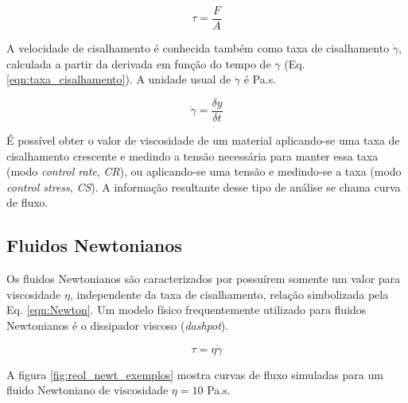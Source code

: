 			\begin{equation}
				\tau = \frac{F}{A}
				\label{eqn:tensao_cisalhamento}
			\end{equation}
			
			A velocidade de cisalhamento é conhecida também como taxa de cisalhamento \(\dot{\gamma}\), calculada a partir da derivada em função do tempo de \(\gamma\) (Eq. \ref{eqn:taxa_cisalhamento}). A unidade usual de \(\dot{\gamma}\) é Pa.s\menosUm.
			
			\begin{equation}
				\dot{\gamma} = \dfrac{\delta y}{\delta t}
				\label{eqn:taxa_cisalhamento}
			\end{equation}
			
			É possível obter o valor de viscosidade de um material aplicando-se uma taxa de cisalhamento crescente e medindo a tensão necessária para manter essa taxa (modo \emph{control rate}, \emph{CR}), ou aplicando-se uma tensão e medindo-se a taxa (modo \emph{control stress}, \emph{CS}). A informação resultante desse tipo de análise se chama curva de fluxo.
						
			\subsection{Fluidos Newtonianos}
			
			Os fluidos Newtonianos são caracterizados por possuírem somente um valor para viscosidade \(\eta\), independente da taxa de cisalhamento, relação simbolizada pela Eq. \ref{eqn:Newton}. Um modelo físico frequentemente utilizado para fluidos Newtonianos é o dissipador viscoso (\emph{dashpot}).
			
			\begin{equation}
				\tau = \eta\dot{\gamma}
				\label{eqn:Newton}
			\end{equation}
			
			A figura \ref{fig:reol_newt_exemplos} mostra curvas de fluxo simuladas para um fluido Newtoniano de viscosidade \(\eta=10\) Pa.s\menosUm.
			
